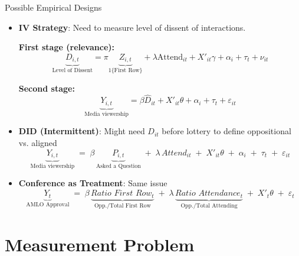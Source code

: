 \documentclass[10pt,aspectratio=169]{beamer}
\begin{document}
\begin{frame}{Possible Empirical Designs}
\small

\begin{itemize}
    \item \textbf{IV Strategy}: Need to measure level of dissent of interactions.

\textbf{First stage (relevance):}
\[
\underbrace{ D_{i,t}}_{\text{Level of Dissent}} = \pi \underbrace{ Z_{i,t}}_{\text{1\{First Row\}}} + \lambda \text{Attend}_{it} + X'_{it}\gamma + \alpha_i + \tau_t + \nu_{it}
\]

\textbf{Second stage:}
\[
\underbrace{ Y_{i,t}}_{\text{Media viewership}} = \beta \widehat{D}_{it} + X'_{it}\theta + \alpha_i + \tau_t + \varepsilon_{it}
\]
\end{itemize}

\vspace{0.5em}

\begin{itemize}
    \item \textbf{DID (Intermittent)}: Might need $D_{it}$ before lottery to define oppositional vs. aligned
\[
\underbrace{ Y_{i,t}}_{\text{Media viewership}}
\;=\;
\beta\,\underbrace{ P_{i,t}}_{\text{Asked a Question}}
\;+\;
\lambda\,\textit{Attend}_{it}
\;+\;
X'_{it}\theta
\;+\;
\alpha_i
\;+\;
\tau_t
\;+\;
\varepsilon_{it}
\]
\end{itemize}

\vspace{0.5em}

\begin{itemize}
    \item \textbf{Conference as Treatment}: Same issue
\[
\underbrace{ Y_{t}}_{\text{AMLO Approval}}
\;=\;
\beta\,\underbrace{ \textit{Ratio First Row}_{t}}_{\text{Opp./Total First Row}}
\;+\;
\lambda\,\underbrace{ \textit{Ratio Attendance}_{t}}_{\text{Opp./Total Attending}}
\;+\;
X'_{t}\theta
\;+\;
\varepsilon_{t}
\]
\end{itemize}

\end{frame}

\section{Measurement Problem}
\end{document}
